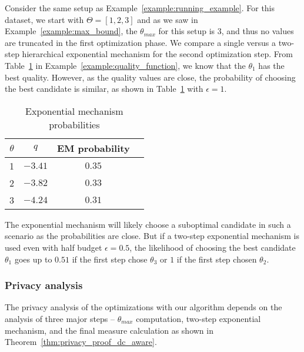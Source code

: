 \begin{example}\label{example:parameter_selection}
    Consider the same setup as Example~\ref{example:running_example}. For this dataset, we start with $\Theta = [1, 2, 3]$ and as we saw in Example~\ref{example:max_bound}, the $\theta_{max}$ for this setup is 3, and thus no values are truncated in the first optimization phase. We compare a single versus a two-step hierarchical exponential mechanism for the second optimization step. From Table~\ref{tab:example_expo_prob} in Example~\ref{example:quality_function}, we know that the $\theta_1$ has the best quality. However, as the quality values are close, the probability of choosing the best candidate is similar, as shown in Table~\ref{tab:example_expo_prob} with $\epsilon=1$.
    \begin{table}[]
        \centering
        \begin{tabular}{|c|c|c|c|}
             \hline
             $\theta$ & $q$ & EM probability   \\
             \hline
             1 & $-3.41$ & $0.35$\\
             2 & $-3.82$ & $0.33$\\
             3 & $-4.24$ & $0.31$\\
             \hline
        \end{tabular}
        \caption{Exponential mechanism probabilities}
        \label{tab:example_expo_prob}
    \end{table}
    The exponential mechanism will likely choose a suboptimal candidate in such a scenario as the probabilities are close. But if a two-step exponential mechanism is used even with half budget $\epsilon = 0.5$, the likelihood of choosing the best candidate $\theta_1$ goes up to $0.51$ if the first step chose $\theta_3$ or $1$ if the first step chosen $\theta_2$.
\end{example}

\subsubsection{Privacy analysis}

The privacy analysis of the optimizations with our algorithm depends on the analysis of three major steps -- $\theta_{max}$ computation, two-step exponential mechanism, and the final measure calculation as shown in Theorem~\ref{thm:privacy_proof_dc_aware}. 

